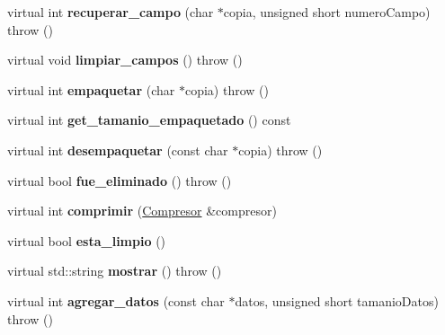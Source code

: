 \begin{DoxyCompactItemize}
\item 
\hypertarget{class_registro_variable_ae3dd742ac81e10e3079373ad214cd35c}{virtual int {\bfseries recuperar\-\_\-campo} (char $\ast$copia, unsigned short numero\-Campo)  throw ()}\label{class_registro_variable_ae3dd742ac81e10e3079373ad214cd35c}

\item 
\hypertarget{class_registro_variable_aeb114147e4157392dcf566eae3f25762}{virtual void {\bfseries limpiar\-\_\-campos} ()  throw ()}\label{class_registro_variable_aeb114147e4157392dcf566eae3f25762}

\item 
\hypertarget{class_registro_variable_a29e1458f4f6fc61a973900646b029f7a}{virtual int {\bfseries empaquetar} (char $\ast$copia)  throw ()}\label{class_registro_variable_a29e1458f4f6fc61a973900646b029f7a}

\item 
\hypertarget{class_registro_variable_abbacfdeeda2eb19ac96e56da7c78e248}{virtual int {\bfseries get\-\_\-tamanio\-\_\-empaquetado} () const }\label{class_registro_variable_abbacfdeeda2eb19ac96e56da7c78e248}

\item 
\hypertarget{class_registro_variable_a86773dbc9062ceaab2e0b4d2854f1e99}{virtual int {\bfseries desempaquetar} (const char $\ast$copia)  throw ()}\label{class_registro_variable_a86773dbc9062ceaab2e0b4d2854f1e99}

\item 
\hypertarget{class_registro_variable_aefa9af03826f3bf799a764b86f8ca2de}{virtual bool {\bfseries fue\-\_\-eliminado} ()  throw ()}\label{class_registro_variable_aefa9af03826f3bf799a764b86f8ca2de}

\item 
\hypertarget{class_registro_variable_a6ffb22be7872a49f5a0e26fbcbf11108}{virtual int {\bfseries comprimir} (\hyperlink{class_compresor}{\-Compresor} \&compresor)}\label{class_registro_variable_a6ffb22be7872a49f5a0e26fbcbf11108}

\item 
\hypertarget{class_registro_variable_ade36dc280adef9721ba06ca9c4d83435}{virtual bool {\bfseries esta\-\_\-limpio} ()}\label{class_registro_variable_ade36dc280adef9721ba06ca9c4d83435}

\item 
\hypertarget{class_registro_variable_a6fe809f5f1f9898e1c3a7fd8a7bbcc87}{virtual std\-::string {\bfseries mostrar} ()  throw ()}\label{class_registro_variable_a6fe809f5f1f9898e1c3a7fd8a7bbcc87}

\item 
\hypertarget{class_registro_variable_a93f4996ab7cb5bb6a73c0e827182760f}{virtual int {\bfseries agregar\-\_\-datos} (const char $\ast$datos, unsigned short tamanio\-Datos)  throw ()}\label{class_registro_variable_a93f4996ab7cb5bb6a73c0e827182760f}

\end{DoxyCompactItemize}
